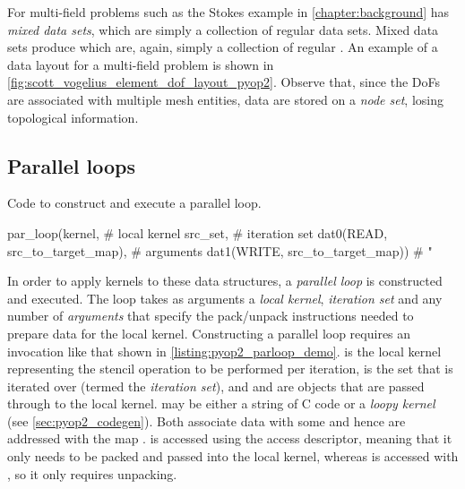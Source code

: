 \documentclass[thesis]{subfiles}
\begin{document}
For multi-field problems such as the Stokes example in \cref{chapter:background}  has \emph{mixed data sets}, which are simply a collection of regular data sets.
Mixed data sets produce  which are, again, simply a collection of regular .
An example of a  data layout for a multi-field problem is shown in \cref{fig:scott_vogelius_element_dof_layout_pyop2}.
Observe that, since the DoFs are associated with multiple mesh entities, data are stored on a \emph{node set}, losing topological information.

\subsection{Parallel loops}
\label{sec:pyop2_parallel}

\begin{listing}
  \caption{Code to construct and execute a  parallel loop.}
  \begin{minipage}{.9\textwidth}
    \begin{pyalg2}
      par_loop(kernel,                          # local kernel
               src_set,                         # iteration set
               dat0(READ, src_to_target_map),   # arguments
               dat1(WRITE, src_to_target_map))  #    "
    \end{pyalg2}
  \end{minipage}
  \label{listing:pyop2_parloop_demo}
\end{listing}

In order to apply kernels to these data structures, a \emph{parallel loop} is constructed and executed.
The loop takes as arguments a \emph{local kernel}, \emph{iteration set} and any number of \emph{arguments} that specify the pack/unpack instructions needed to prepare data for the local kernel.
Constructing a parallel loop requires an invocation like that shown in \cref{listing:pyop2_parloop_demo}.
 is the local kernel representing the stencil operation to be performed per iteration,  is the set that is iterated over (termed the \emph{iteration set}), and  and  are  objects that are passed through to the local kernel.
 may be either a string of C code or a \emph{loopy kernel} (see \cref{sec:pyop2_codegen}).
Both  associate data with some  and hence are addressed with the map .
 is accessed using the  access descriptor, meaning that it only needs to be packed and passed into the local kernel, whereas  is accessed with , so it only requires unpacking.
\end{document}
